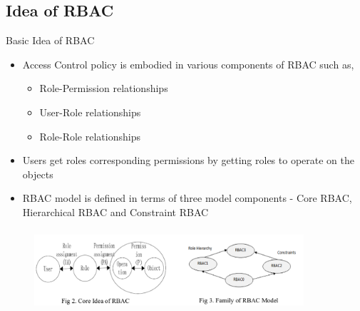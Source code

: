 \documentclass[xcolor=dvipsnames]{beamer}
\begin{document}
\subsection{Idea of RBAC}
\begin{frame}{Basic Idea of RBAC}
\begin{itemize}
	\item  Access Control policy is embodied in various components of RBAC such as,
	\begin{itemize}
	\item Role-Permission relationships
	\item User-Role relationships
	\item Role-Role relationships
	\end{itemize}
	\item Users get roles corresponding permissions by getting roles to operate on the objects
	\item RBAC model is defined in terms of three model components - Core RBAC, Hierarchical RBAC and Constraint RBAC
\end{itemize}
\begin{figure}[H]
\includegraphics[width=10cm,height=3cm]{sunny2_r}
\end{figure}
\end{frame}
\end{document}
